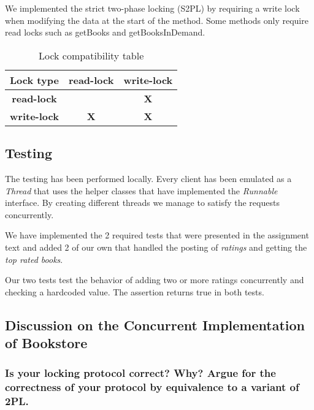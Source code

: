 \documentclass{article}      %
\begin{document}
We implemented the strict two-phase locking (S2PL) by requiring a write lock when modifying the data at the start of the method. Some methods only require read locks such as getBooks and getBooksInDemand.\\

\begin{table}[h]
\begin{center}
\begin{tabular}{|c|c|c|}
\hline
{\bf{Lock type}} & \bf{read-lock} & \bf{write-lock} \\ \hline
\bf{read-lock} & \multicolumn{1}{l|}{} & \bf{X} \\ \hline
\bf{write-lock} & \bf{X} & \bf{X} \\ \hline
\end{tabular}
\caption{Lock compatibility table}
\label{Lock compatibility table}
\end{center}
\end{table}

\subsection*{Testing}

The testing has been performed locally. Every client has been emulated as a \emph{Thread} that uses the helper classes that have implemented the \emph{Runnable} interface. By creating different threads we manage to satisfy the requests concurrently.  

We have implemented the 2 required tests that were presented in the assignment text and added 2 of our own that handled the posting of \emph{ratings} and getting the \emph{top rated books}.

Our two tests test the behavior of adding two or more ratings concurrently and checking a hardcoded value. The assertion returns true in both tests.

\subsection*{Discussion on the Concurrent Implementation of Bookstore}

\subsubsection*{Is your locking protocol correct? Why? Argue for the correctness of your protocol by equivalence to a variant of 2PL.}
\end{document}
